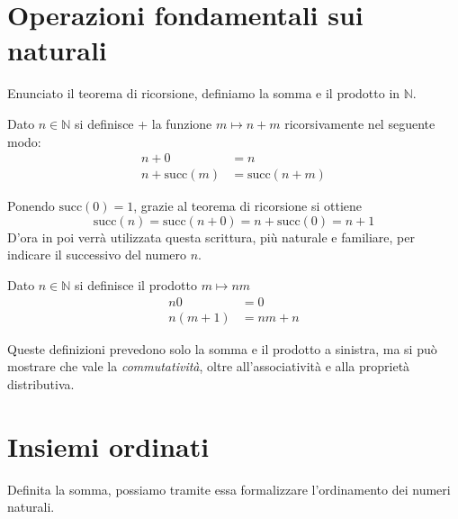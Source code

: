 \section{Operazioni fondamentali sui naturali}
Enunciato il teorema di ricorsione, definiamo la somma e il prodotto
in $\mathbb{N}$.
\begin{tcolorbox}[colback=yellow!30, colframe=yellow!30!black, title={Somma in $\mathbb{N}$}]
Dato $n\in\mathbb{N}$ si definisce + la funzione $m\mapsto n+m$ ricorsivamente
nel seguente modo:
\begin{align*}
    n + 0 &= n\\
    n + \text{succ}(m) &= \text{succ}(n + m)
\end{align*}
\end{tcolorbox}

Ponendo $\text{succ}(0) = 1$, grazie al teorema di ricorsione si ottiene
\[ \text{succ}(n) = \text{succ}(n + 0) = n + \text{succ}(0) = n + 1 \]
D'ora in poi verrà utilizzata questa scrittura, più naturale e familiare,
per indicare il successivo del numero $n$.

\begin{tcolorbox}[colback=yellow!30, colframe=yellow!30!black, title={Prodotto in $\mathbb{N}$}]
Dato $n\in\mathbb{N}$ si definisce il prodotto $m\mapsto nm$
\begin{align*}
    n0 &= 0\\
    n(m+1) &= nm + n
\end{align*}
\end{tcolorbox}

\begin{osservaz}
Queste definizioni prevedono solo la
somma e il prodotto a sinistra, ma si può mostrare che vale
la \textit{commutatività}, oltre all'associatività e alla
proprietà distributiva.
\end{osservaz}


\section{Insiemi ordinati}
Definita la somma, possiamo tramite essa formalizzare
l'ordinamento dei numeri naturali.

